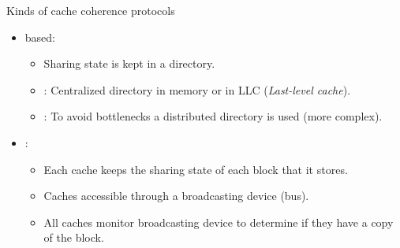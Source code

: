\begin{frame}[t]{Kinds of cache coherence protocols}
\begin{itemize}
  \item {} based:
    \begin{itemize}
      \item Sharing state is kept in a directory.
      \item {}: Centralized directory in memory or in LLC (\emph{Last-level cache}).
      \item {}: To avoid bottlenecks a distributed directory is used (more complex).
    \end{itemize}

  \item {}:
    \begin{itemize}
      \item Each cache keeps the sharing state of each block that it stores.
      \item Caches accessible through a broadcasting device (bus).
      \item All caches monitor broadcasting device to determine if they have a copy of the block.
    \end{itemize}
\end{itemize}
\end{frame}
